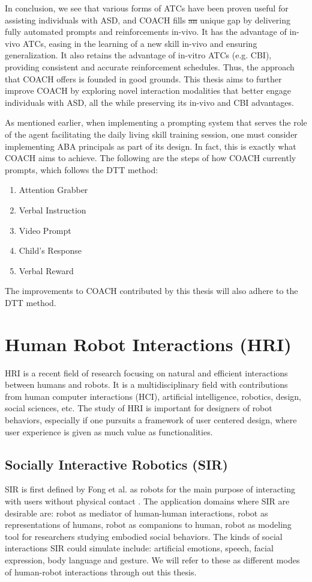 \documentclass{ut-thesis}
\providecommand{\DIFaddtex}[1]{{\protect\color{blue}\uwave{#1}}} %
\providecommand{\DIFdeltex}[1]{{\protect\color{red}\sout{#1}}}                      %
\providecommand{\DIFaddbegin}{} %
\providecommand{\DIFaddend}{} %
\providecommand{\DIFdelbegin}{} %
\providecommand{\DIFdelend}{} %
\providecommand{\DIFadd}[1]{\texorpdfstring{\DIFaddtex{#1}}{#1}} %
\providecommand{\DIFdel}[1]{\texorpdfstring{\DIFdeltex{#1}}{}} %
\begin{document}
In conclusion, we see that various forms of ATCs have been proven useful for assisting individuals with ASD, and COACH fills \DIFdelbegin \DIFdel{an }\DIFdelend \DIFaddbegin \DIFadd{a }\DIFaddend unique gap by delivering fully automated prompts and reinforcements in-vivo.  It has the advantage of in-vivo ATCs, easing in the learning of a new skill in-vivo and ensuring generalization.  It also retains the advantage of in-vitro ATCs (e.g. CBI), providing consistent and accurate reinforcement schedules.  Thus, the approach that COACH offers is founded in good grounds.  This thesis aims to further improve COACH by exploring novel interaction modalities that better engage individuals with ASD, all the while preserving its in-vivo and CBI advantages.

\label{sec:DTTDiscussion}
As mentioned earlier, when implementing a prompting system that serves the role of the agent facilitating the daily living skill training session, one must consider implementing ABA principals as part of its design.  In fact, this is exactly what COACH aims to achieve.  The following are the steps of how COACH currently prompts, which follows the DTT method:
\begin{enumerate}
	\item Attention Grabber
	\item Verbal Instruction
	\item Video Prompt
	\item Child's Response
	\item Verbal Reward
\end{enumerate}
The improvements to COACH contributed by this thesis will also adhere to the DTT method.

\section{Human Robot Interactions (HRI)}

HRI is a recent field of research focusing on natural and efficient interactions between humans and robots.  It is a multidisciplinary field with contributions from human computer interactions (HCI), artificial intelligence, robotics, design, social sciences, etc.  The study of HRI is important for designers of robot behaviors, especially if one pursuits a framework of user centered design, where user experience is given as much value as functionalities. 


\subsection{Socially Interactive Robotics (SIR)}
SIR is first defined by Fong et al. as robots for the main purpose of interacting with users without physical contact \cite{fong2003survey}.  The application domains where SIR are desirable are: robot as mediator of human-human interactions, robot as representations of humans, robot as companions to human, robot as modeling tool for researchers studying embodied social behaviors.  The kinds of social interactions SIR could simulate include: artificial emotions, speech, facial expression, body language and gesture.  We will refer to these as different modes of human-robot interactions through out this thesis.
\end{document}
